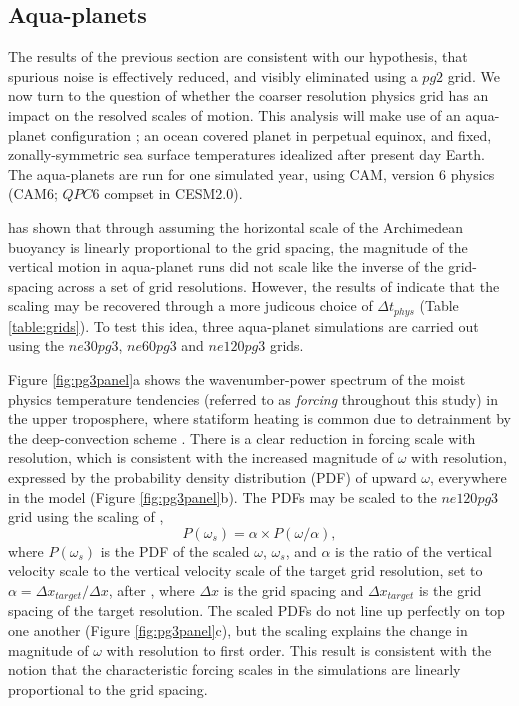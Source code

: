 \documentclass{agujournal}
\begin{document}
\subsection{Aqua-planets}

The results of the previous section are consistent with our hypothesis, that spurious noise is effectively reduced, and visibly eliminated using a $pg2$ grid. We now turn to the question of whether the coarser resolution physics grid has an impact on the resolved scales of motion. This analysis will make use of an aqua-planet configuration \citep{NH2000ASL,MWO2016JAMES}; an ocean covered planet in perpetual equinox, and fixed, zonally-symmetric sea surface temperatures idealized after present day Earth. The aqua-planets are run for one simulated year, using CAM, version 6 physics (CAM6; $QPC6$ compset in CESM2.0).

\cite{HR2017JCLIM} has shown that through assuming the horizontal scale of the Archimedean buoyancy is linearly proportional to the grid spacing, the magnitude of the vertical motion in aqua-planet runs did not scale like the inverse of the grid-spacing across a set of grid resolutions. However, the results of \cite{HR2018JAMES} indicate that the scaling may be recovered through a more judicous choice of $\Delta t_{phys}$ (Table \ref{table:grids}). To test this idea, three aqua-planet simulations are carried out using the $ne30pg3$, $ne60pg3$ and $ne120pg3$ grids. 

Figure \ref{fig:pg3panel}a shows the wavenumber-power spectrum of the moist physics temperature tendencies (referred to as {\em{forcing}} throughout this study) in the upper troposphere, where statiform heating is common due to detrainment by the deep-convection scheme \citep{ZM1995AO}. There is a clear reduction in forcing scale with resolution, which is consistent with the increased magnitude of $\omega$ with resolution, expressed by the probability density distribution (PDF) of upward $\omega$, everywhere in the model (Figure \ref{fig:pg3panel}b). The PDFs may be scaled to the $ne120pg3$ grid using the scaling of \cite{PG2006JAS}, 
\begin{equation}
P(\omega_{s}) = \alpha \times P(\omega/\alpha),\label{eq:pdf}
\end{equation}
where $P(\omega_{s})$ is the PDF of the scaled $\omega$, $\omega_{s}$, and $\alpha$ is the ratio of the vertical velocity scale to the vertical velocity scale of the target grid resolution, set to $\alpha = \Delta x_{target}/\Delta x$, after \citep{HR2018JAMES}, where $\Delta x$ is the grid spacing and $\Delta x_{target}$ is the grid spacing of the target resolution. The scaled PDFs do not line up perfectly on top one another (Figure \ref{fig:pg3panel}c), but the scaling explains the change in magnitude of $\omega$ with resolution to first order. This result is consistent with the notion that the characteristic forcing scales in the simulations are linearly proportional to the grid spacing.
\end{document}
